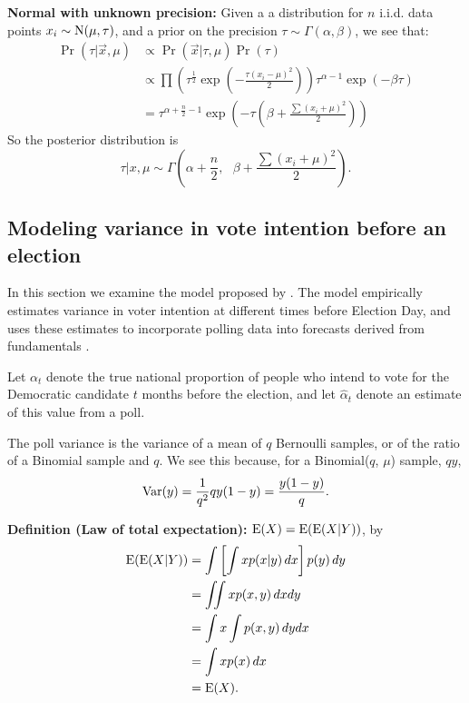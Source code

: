 \documentclass[thesis.tex]{subfiles}
\begin{document}
\bigskip
\bigskip

\noindent\textbf{Normal with unknown precision:} Given a a distribution for $n$ i.i.d. data points $x_i \sim \operatorname{N}(\mu, \tau)$, and a prior on the precision $\tau \sim \Gamma(\alpha, \beta)$, we see that: \begin{align*}
\Pr(\tau | \vec{x}, \mu) &\propto \Pr(\vec{x} | \tau, \mu)\Pr(\tau) \\
&\propto \prod\left(\tau^{\frac{1}{2}}\exp\left(  -\frac{\tau(x_i - \mu)^2}{2}  \right)\right) \tau^{\alpha-1}\exp(-\beta\tau) \\
&= \tau^{\alpha + \frac{n}{2} - 1}\exp\left(  -\tau\left(\beta + \frac{\sum(x_i + \mu)^2}{2}\right)  \right)
\end{align*}
So the posterior distribution is \[
\tau | x, \mu \sim \Gamma\left(  \alpha + \frac{n}{2}, \text{ } \beta + \frac{\sum(x_i + \mu)^2}{2}  \right).
\]

\bigskip
\bigskip

\subsection{Modeling variance in vote intention before an election}


In this section we examine the model proposed by \cite{Lock:2010aa}. The model empirically estimates variance in voter intention at different times before Election Day, and uses these estimates to incorporate polling data into forecasts derived from fundamentals \citep{Hibbs:2008aa}.

Let \(\alpha_t\) denote the true national proportion of people who intend to vote for the Democratic candidate \(t\) months before the election, and let \(\widehat{\alpha}_t\) denote an estimate of this value from a poll.

The poll variance is the variance of a mean of \(q\) Bernoulli samples, or of the ratio of a Binomial sample and \(q\). We see this because, for a Binomial(\(q\), \(\mu\)) sample, \(qy\), \begin{equation}\begin{aligned}
  \operatorname{Var}(y) = \frac{1}{q^2}qy(1-y) = \frac{y(1-y)}{q}.
\end{aligned}\end{equation}

\bigskip
\bigskip

\noindent\textbf{Definition (Law of total expectation):} \(\operatorname{E} (X) = \operatorname{E}(\operatorname{E}(X | Y))\), by\begin{equation}
\begin{aligned}
	\operatorname{E}(\operatorname{E}(X | Y)) &= \int \left[\int x p(x | y)\, dx\right] p(y)\, dy \\
	&= \iint x p(x, y)\, dx dy \\
	&= \int x \int p(x, y)\, dy dx \\
	&= \int x p(x) \, dx \\
	&= \operatorname{E}(X).
\end{aligned}
\end{equation}
\end{document}
